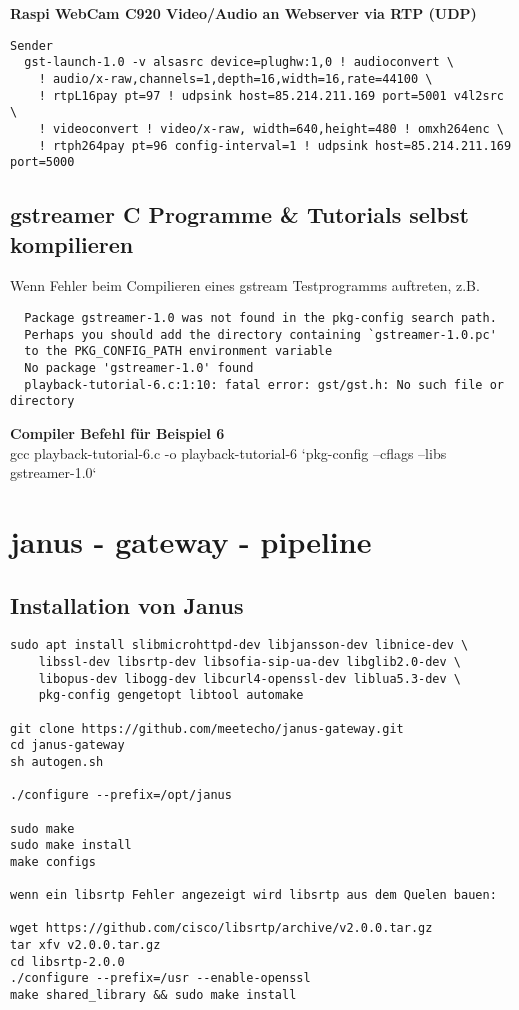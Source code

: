 \textbf{Raspi WebCam C920 Video/Audio an Webserver via RTP (UDP)}
\begin{verbatim}
Sender
  gst-launch-1.0 -v alsasrc device=plughw:1,0 ! audioconvert \
    ! audio/x-raw,channels=1,depth=16,width=16,rate=44100 \
    ! rtpL16pay pt=97 ! udpsink host=85.214.211.169 port=5001 v4l2src \
    ! videoconvert ! video/x-raw, width=640,height=480 ! omxh264enc \
    ! rtph264pay pt=96 config-interval=1 ! udpsink host=85.214.211.169 port=5000
\end{verbatim}

\subsection{gstreamer C Programme \& Tutorials selbst kompilieren}

Wenn Fehler beim Compilieren eines gstream Testprogramms auftreten, z.B.
\begin{verbatim}
  Package gstreamer-1.0 was not found in the pkg-config search path.
  Perhaps you should add the directory containing `gstreamer-1.0.pc'
  to the PKG_CONFIG_PATH environment variable
  No package 'gstreamer-1.0' found
  playback-tutorial-6.c:1:10: fatal error: gst/gst.h: No such file or directory
\end{verbatim}

\textbf{Compiler Befehl für Beispiel 6}\\
gcc playback-tutorial-6.c -o playback-tutorial-6 `pkg-config --cflags --libs gstreamer-1.0`

\section{janus - gateway - pipeline}

\subsection{Installation von Janus}
\begin{verbatim}
sudo apt install slibmicrohttpd-dev libjansson-dev libnice-dev \
	libssl-dev libsrtp-dev libsofia-sip-ua-dev libglib2.0-dev \
	libopus-dev libogg-dev libcurl4-openssl-dev liblua5.3-dev \
	pkg-config gengetopt libtool automake

git clone https://github.com/meetecho/janus-gateway.git
cd janus-gateway
sh autogen.sh

./configure --prefix=/opt/janus

sudo make 
sudo make install 
make configs

wenn ein libsrtp Fehler angezeigt wird libsrtp aus dem Quelen bauen:

wget https://github.com/cisco/libsrtp/archive/v2.0.0.tar.gz
tar xfv v2.0.0.tar.gz
cd libsrtp-2.0.0
./configure --prefix=/usr --enable-openssl
make shared_library && sudo make install
\end{verbatim}

